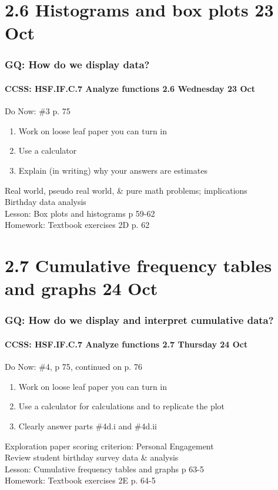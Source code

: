 \documentclass{beamer}
\begin{document}
  \section{2.6 Histograms and box plots 23 Oct}
  \frame
  {
    \frametitle{GQ: How do we display data?}
    \framesubtitle{CCSS: HSF.IF.C.7 Analyze functions \hfill \alert{2.6 Wednesday 23 Oct}}

    \begin{block}{Do Now: \#3 p. 75}
    \begin{enumerate}
        \item Work on loose leaf paper you can turn in
        \item Use a calculator
        \item Explain (in writing) why your answers are estimates
    \end{enumerate}
    \end{block}
    Real world, pseudo real world, \& pure math problems; implications \\
    Birthday data analysis \\
    Lesson: Box plots and histograms p 59-62\\ \smallskip
    Homework: Textbook exercises 2D p. 62
  }

  \section{2.7 Cumulative frequency tables and graphs 24 Oct}
  \frame
  {
    \frametitle{GQ: How do we display and interpret cumulative data?}
    \framesubtitle{CCSS: HSF.IF.C.7 Analyze functions \hfill \alert{2.7 Thursday 24 Oct}}

    \begin{block}{Do Now: \#4, p 75, continued on p. 76}
    \begin{enumerate}
        \item Work on loose leaf paper you can turn in
        \item Use a calculator for calculations and to replicate the plot
        \item Clearly answer parts \#4d.i and \#4d.ii
    \end{enumerate}
    \end{block}
    Exploration paper scoring criterion: Personal Engagement\\
    Review student birthday survey data \& analysis \\
    Lesson: Cumulative frequency tables and graphs p 63-5\\ \smallskip
    Homework: Textbook exercises 2E p. 64-5
  }
\end{document}
